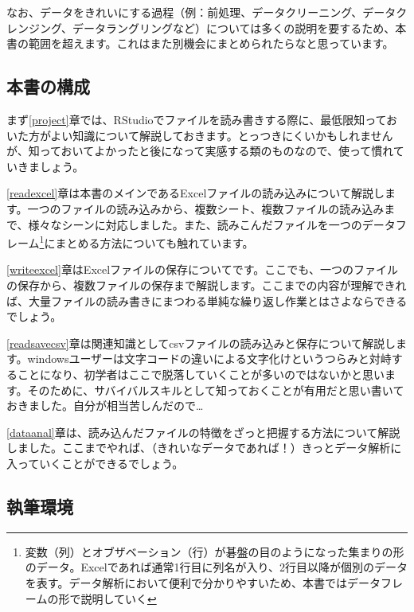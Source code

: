 \documentclass[
  xelatex,ja=standard, b5paper]{bxjsbook}
\begin{document}
なお、データをきれいにする過程（例：前処理、データクリーニング、データクレンジング、データラングリングなど）については多くの説明を要するため、本書の範囲を超えます。これはまた別機会にまとめられたらなと思っています。

\hypertarget{structure}{%
\subsection*{本書の構成}\label{structure}}

まず\ref{project}章では、RStudioでファイルを読み書きする際に、最低限知っておいた方がよい知識について解説しておきます。とっつきにくいかもしれませんが、知っておいてよかったと後になって実感する類のものなので、使って慣れていきましょう。

\ref{readexcel}章は本書のメインであるExcelファイルの読み込みについて解説します。一つのファイルの読み込みから、複数シート、複数ファイルの読み込みまで、様々なシーンに対応しました。また、読みこんだファイルを一つのデータフレーム\footnote{変数（列）とオブザベーション（行）が碁盤の目のようになった集まりの形のデータ。Excelであれば通常1行目に列名が入り、2行目以降が個別のデータを表す。データ解析において便利で分かりやすいため、本書ではデータフレームの形で説明していく}にまとめる方法についても触れています。

\ref{writeexcel}章はExcelファイルの保存についてです。ここでも、一つのファイルの保存から、複数ファイルの保存まで解説します。ここまでの内容が理解できれば、大量ファイルの読み書きにまつわる単純な繰り返し作業とはさよならできるでしょう。

\ref{readsavecsv}章は関連知識としてcsvファイルの読み込みと保存について解説します。windowsユーザーは文字コードの違いによる文字化けというつらみと対峙することになり、初学者はここで脱落していくことが多いのではないかと思います。そのために、サバイバルスキルとして知っておくことが有用だと思い書いておきました。自分が相当苦しんだので\ldots{}

\ref{dataanal}章は、読み込んだファイルの特徴をざっと把握する方法について解説しました。ここまでやれば、（きれいなデータであれば！）きっとデータ解析に入っていくことができるでしょう。

\hypertarget{ux57f7ux7b46ux74b0ux5883}{%
\subsection*{執筆環境}\label{ux57f7ux7b46ux74b0ux5883}}
\end{document}
